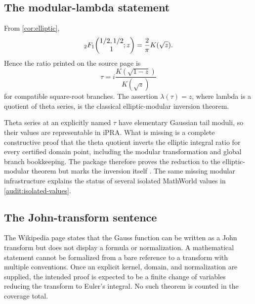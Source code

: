 \subsection{The modular-lambda statement}

From \cref{cor:elliptic},
\[
 {}_2F_1\!\left(\begin{matrix}1/2,1/2\\1\end{matrix};z\right)=\frac2\pi K(\sqrt z).
\]
Hence the ratio printed on the source page is
\[
 \tau=i\frac{K(\sqrt{1-z})}{K(\sqrt z)}
\]
for compatible square-root branches.  The assertion
\(\lambda(\tau)=z\), where lambda is a quotient of theta series, is the
classical elliptic-modular inversion theorem.

\begin{audit}
Theta series at an explicitly named \(\tau\) have elementary Gaussian tail
moduli, so their values are representable in iPRA.  What is missing is a
complete constructive proof that the theta quotient inverts the elliptic
integral ratio for every certified domain point, including the modular
transformation and global branch bookkeeping.  The package therefore proves
the reduction to the elliptic-modular theorem but marks the inversion itself
\StatusD{}.  The same missing modular infrastructure explains the status of
several isolated MathWorld values in \cref{audit:isolated-values}.
\end{audit}

\subsection{The John-transform sentence}

The Wikipedia page states that the Gauss function can be written as a John
transform but does not display a formula or normalization.  A mathematical
statement cannot be formalized from a bare reference to a transform with
multiple conventions.  Once an explicit kernel, domain, and normalization
are supplied, the intended proof is expected to be a finite change of
variables reducing the transform to Euler's integral.  No such theorem is
counted in the coverage total.

